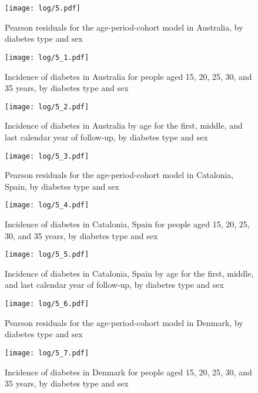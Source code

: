 \documentclass[11pt]{article}
\begin{document}
\color{Blue4}
\begin{stlog}\end{stlog}
\begin{figure}
    \centering
    \texttt{[image: log/5.pdf]}
    \caption{Pearson residuals for the age-period-cohort model in Australia, by diabetes type and sex}
    \label{Australia agespec}
\end{figure}
\begin{figure}
    \centering
    \texttt{[image: log/5\_1.pdf]}
    \caption{Incidence of diabetes in Australia for people aged 15, 20, 25, 30, and 35 years, by diabetes type and sex}
    \label{Australia agespec}
\end{figure}
\begin{figure}
    \centering
    \texttt{[image: log/5\_2.pdf]}
    \caption{Incidence of diabetes in Australia by age for the first, middle, and last calendar year of follow-up, by diabetes type and sex}
    \label{Australia agespec}
\end{figure}
\begin{figure}
    \centering
    \texttt{[image: log/5\_3.pdf]}
    \caption{Pearson residuals for the age-period-cohort model in Catalonia, Spain, by diabetes type and sex}
    \label{Catalonia, Spain agespec}
\end{figure}
\begin{figure}
    \centering
    \texttt{[image: log/5\_4.pdf]}
    \caption{Incidence of diabetes in Catalonia, Spain for people aged 15, 20, 25, 30, and 35 years, by diabetes type and sex}
    \label{Catalonia, Spain agespec}
\end{figure}
\begin{figure}
    \centering
    \texttt{[image: log/5\_5.pdf]}
    \caption{Incidence of diabetes in Catalonia, Spain by age for the first, middle, and last calendar year of follow-up, by diabetes type and sex}
    \label{Catalonia, Spain agespec}
\end{figure}
\begin{figure}
    \centering
    \texttt{[image: log/5\_6.pdf]}
    \caption{Pearson residuals for the age-period-cohort model in Denmark, by diabetes type and sex}
    \label{Denmark agespec}
\end{figure}
\begin{figure}
    \centering
    \texttt{[image: log/5\_7.pdf]}
    \caption{Incidence of diabetes in Denmark for people aged 15, 20, 25, 30, and 35 years, by diabetes type and sex}
    \label{Denmark agespec}
\end{figure}
\end{document}
